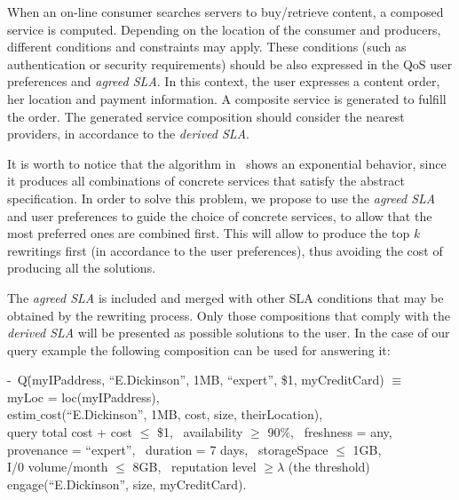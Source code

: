 When an on-line consumer searches servers to buy/retrieve content, a composed  service is computed.
Depending on the location of the consumer and producers, different conditions and constraints may apply.
These conditions (such as authentication or security requirements) should  be also expressed in the QoS user preferences and {\em agreed SLA}.
In this context, the user  expresses a content order, her location and payment information. 
A composite  service is  generated to fulfill the order.
The generated service composition should consider the nearest providers, in accordance to the {\em derived SLA}.


It is worth to notice that the algorithm in~\cite{CostaAMR13} shows an exponential behavior, since it produces all combinations of concrete services that satisfy the abstract specification.
In order to solve this problem, we propose to use the \textit{agreed SLA} and user preferences to guide the choice of concrete services, to allow that the most preferred ones are combined first.
This will allow to produce the top \textit{k} rewritings first (in accordance to the user preferences), thus avoiding the cost of producing all the solutions.

The {\em agreed SLA} is included and merged with other SLA conditions that may be obtained by the rewriting process. Only those compositions that comply with the {\em derived SLA} will be presented as possible solutions to the user.
In the case of our query example the following composition can be used for answering it:

\begin{footnotesize}
\sf
\begin{tabbing}
 -~Q\=(myIPaddress, ``E.Dickinson'', 1MB, ``expert'', \$1, myCreditCard) $\equiv$ \\
 \>  myLoc = loc(myIPaddress), \\
 \>  estim$\_$cost(``E.Dickinson'', 1MB, cost, size, theirLocation), \\
 \>  query total cost + cost $\leq$ \$1, 
 \   availability $\geq$ 90$\%$, 
 \  freshness = any, \\
 \>  provenance = ``expert'', 
 \   duration = 7 days, 
 \   storageSpace $\leq$ 1GB, \\
 \>  I/0 volume/month $\leq$ 8GB, 
 \   reputation level $\geq \lambda$ (the threshold) \\
 \>  engage(``E.Dickinson'', size, myCreditCard).
 \end{tabbing} 
\end{footnotesize}


